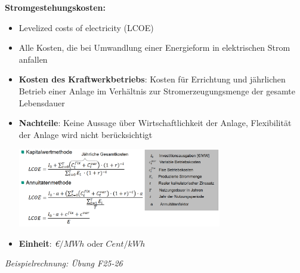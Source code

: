 \textbf{Stromgestehungskosten:}
\begin{itemize}
	\item Levelized costs of electricity (LCOE)
	\item Alle Kosten, die bei Umwandlung einer Energieform in elektrischen Strom anfallen
	\item \textbf{Kosten des Kraftwerkbetriebs}: Kosten für Errichtung und jährlichen Betrieb einer Anlage im Verhältnis zur Stromerzeugungsmenge der gesamte Lebensdauer
	\item \textbf{Nachteile}: Keine Aussage über Wirtschaftlichkeit der Anlage, Flexibilität der Anlage wird nicht berücksichtigt
	\begin{center}
		\includegraphics[width=0.7\textwidth]{images/sgk.png}
	\end{center}
	\item \textbf{Einheit}: \textit{\euro}$/MWh$ oder $Cent/kWh$
\end{itemize}
\textit{Beispielrechnung: Übung F25-26}\\

